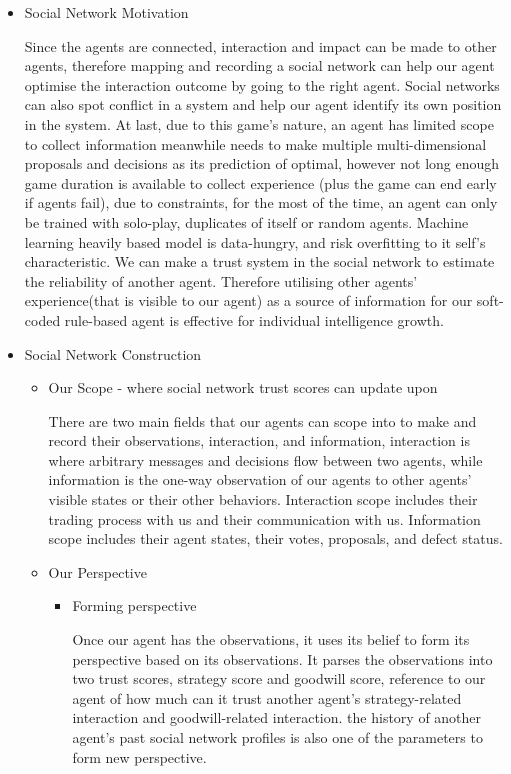 \begin{itemize}
\item Social Network Motivation
    \begin{flushleft}
    \setlength{\parindent}{2em}
     Since the agents are connected, interaction and impact can be made to other agents, therefore mapping and recording a social network can help our agent optimise the interaction outcome by going to the right agent. Social networks can also spot conflict in a system and help our agent identify its own position in the system. At last, due to this game's nature, an agent has limited scope to collect information meanwhile needs to make multiple multi-dimensional proposals and decisions as its prediction of optimal, however not long enough game duration is available to collect experience (plus the game can end early if agents fail), due to constraints, for the most of the time, an agent can only be trained with solo-play, duplicates of itself or random agents. Machine learning heavily based model is data-hungry, and risk overfitting to it self's characteristic. We can make a trust system in the social network to estimate the reliability of another agent. Therefore utilising other agents' experience(that is visible to our agent) as a source of information for our soft-coded rule-based agent is effective for individual intelligence growth.

    \end{flushleft}
\item Social Network Construction
    \begin{itemize}
        \item 	Our Scope - where social network trust scores can update upon
            \begin{flushleft}
            \setlength{\parindent}{2em}
            There are two main fields that our agents can scope into to make and record their observations, interaction, and information, interaction is where arbitrary messages and decisions flow between two agents, while information is the one-way observation of our agents to other agents' visible states or their other behaviors. Interaction scope includes their trading process with us and their communication with us. Information scope includes their agent states, their votes, proposals, and defect status. 
            \end{flushleft}
        \item Our Perspective           
            \begin{itemize}
                \item Forming perspective
                    \begin{flushleft}
                    \setlength{\parindent}{2em}
                    Once our agent has the observations, it uses its belief to form its perspective based on its observations. It parses the observations into two trust scores, strategy score and goodwill score, reference to our agent of how much can it trust another agent's strategy-related interaction and goodwill-related interaction. the history of another agent's past social network profiles is also one of the parameters to form new perspective.


\end{flushleft}
\end{itemize}
\end{itemize}
\end{itemize}
